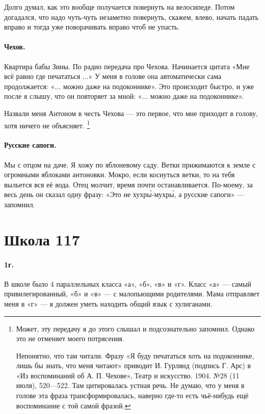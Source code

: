 \documentclass{book}
\begin{document}
Долго думал, как это вообще получается повернуть на велосипеде.
Потом догадался, что надо чуть-чуть незаметно повернуть, скажем, влево, начать падать вправо и тогда уже поворачивать вправо чтоб не упасть.

\paragraph{Чехов.}
Квартира бабы Зины.
По радио передача про Чехова.
Начинается цитата «Мне всё равно где печататься ...»
У меня в голове она автоматически сама продолжается: «... можно даже на подоконнике». 
Это происходит быстро, и уже после я слышу, что он повторяет за мной: «... можно даже на подоконнике».

Назвали меня Антоном в честь Чехова --- это первое, что мне приходит в голову,
хотя ничего не объясняет.%
\footnote{Может, эту передачу я до этого слышал и подсознательно запомнил.
Однако это не отменяет моего потрясения.

Непонятно, что там читали. 
Фразу «Я буду печататься хоть на подоконнике, лишь бы знать, что меня читают» приводит И. Гурлянд (подпись Г. Арс) в  «Из воспоминаний об А. П. Чехове», Театр и искусство. 1904. №28 (11 июля), 520---522.
Там цитировалась устная речь.
Не думаю, что у меня в голове эта фраза трансформировалась, наверно где-то есть чьё-нибудь ещё воспоминание с той самой фразой.}

\paragraph{Русские сапоги.}
Мы с отцом на даче.
Я хожу по яблоневому саду.
Ветки прижимаются к земле с огромными яблоками антоновки.
Мокро, если коснуться ветки, то на тебя выльется вся её вода.
Отец молчит,
время почти останавливается.
По-моему, за весь день он сказал одну фразу: 
«Это не хухр\'{ы}-мухр\'{ы}, а русские сапоги» --- запомнил.

\section*{Школа 117}

\paragraph{1г.}В школе было 4 параллельных класса «а», «б», «в» и «г».
Класс «а» --- самый привилегированный, «б» и «в» --- с малопьющими родителями.
Мама отправляет меня в «г» --- я должен уметь находить общий язык с хулиганами.
\end{document}
